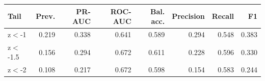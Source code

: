 \begin{tabular}{lrrrrrrr}
\toprule
Tail & Prev. & PR-AUC & ROC-AUC & Bal. acc. & Precision & Recall & F1 \\
\midrule
z$<$-1 & 0.219 & 0.338 & 0.641 & 0.589 & 0.294 & 0.548 & 0.383 \\
z$<$-1.5 & 0.156 & 0.294 & 0.672 & 0.611 & 0.228 & 0.596 & 0.330 \\
z$<$-2 & 0.108 & 0.217 & 0.672 & 0.598 & 0.154 & 0.583 & 0.244 \\
\bottomrule
\end{tabular}
